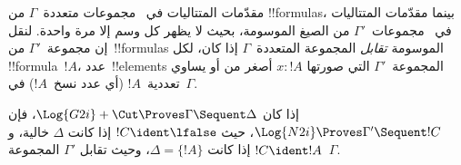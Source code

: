 \documentclass[../../../include/open-logic-section]{subfiles}
\begin{document}


مقدّمات المتتاليات في~ مجموعات متعددة~$\Gamma$ من
!!{formula}s، بينما مقدّمات المتتاليات في~ مجموعات~$\Gamma'$ من
الصيغ الموسومة، بحيث لا يظهر كل وسم إلا مرة واحدة. لنقل إن مجموعة~$\Gamma'$
من~!!{formula}s الموسومة \emph{تقابل} المجموعة المتعددة~$\Gamma$ إذا كان، لكل
!!{formula}~$!A$، عدد~!!{element}s المجموعة~$\Gamma'$ التي صورتها
$x : !A$ أصغر من أو يساوي تعددية~$!A$ (أي عدد نسخ~$!A$) في~$\Gamma$.

\begin{prop}
إذا كان $\Log{G2i} + \Cut \Proves \Gamma \Sequent \Delta$، فإن $\Log{N2i}
\Proves \Gamma' \Sequent !C$، حيث $!C \ident \lfalse$ إذا كانت $\Delta$
خالية، و$!C \ident !A$ إذا كانت $\Delta = \{!A\}$، وحيث تقابل $\Gamma'$
المجموعة~$\Gamma$.
\end{prop}
\end{document}
